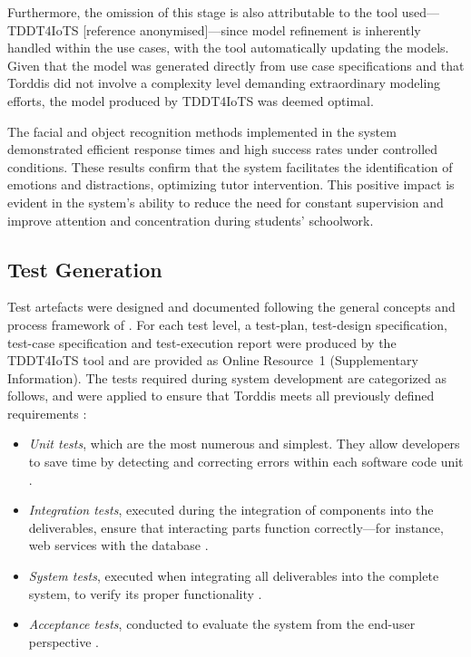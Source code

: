                Furthermore, the omission of this stage is also attributable to the tool used—TDDT4IoTS [reference anonymised]—since model refinement is inherently handled within the use cases, with the tool automatically updating the models. Given that the model was generated directly from use case specifications and that Torddis did not involve a complexity level demanding extraordinary modeling efforts, the model produced by TDDT4IoTS was deemed optimal.
                
                The facial and object recognition methods implemented in the system demonstrated efficient response times and high success rates under controlled conditions. These results confirm that the system facilitates the identification of emotions and distractions, optimizing tutor intervention. This positive impact is evident in the system’s ability to reduce the need for constant supervision and improve attention and concentration during students’ schoolwork.
                
                \subsection{Test Generation}
                Test artefacts were designed and documented following the general concepts and process framework of \citet{ISO-IEC-IEEE29119-1-2022}. For each test level, a test-plan, test-design specification, test-case specification and test-execution report were produced by the TDDT4IoTS tool and are provided as Online Resource~1 (Supplementary Information). The tests required during system development are categorized as follows, and were applied to ensure that Torddis meets all previously defined requirements \citep{Sciarra2024Smash}:
                
                \begin{itemize}
                    \item \textit{Unit tests}, which are the most numerous and simplest. They allow developers to save time by detecting and correcting errors within each software code unit \citep{Mafi2024Regression}.
                    
                    \item \textit{Integration tests}, executed during the integration of components into the deliverables, ensure that interacting parts function correctly—for instance, web services with the database \citep{Spath2025Spring}.
                    
                    \item \textit{System tests}, executed when integrating all deliverables into the complete system, to verify its proper functionality \citep{Smytzek2024Tests4Py, Wang2024Ctest4J}.
                    
                    \item \textit{Acceptance tests}, conducted to evaluate the system from the end-user perspective \citep{Augusto2025Software}.
                \end{itemize}
                
